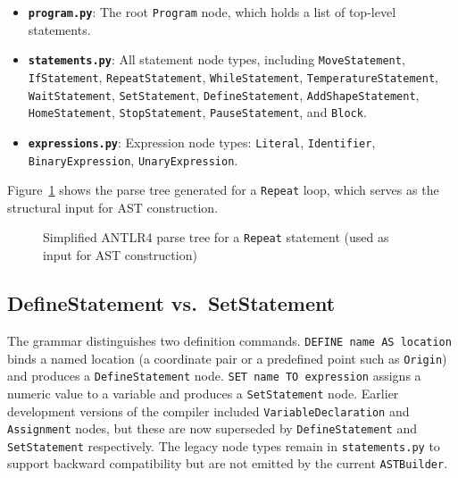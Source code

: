 \begin{itemize}
    \item[-] \textbf{\texttt{program.py}}: The root \texttt{Program} node, which holds a list of top-level statements.
    \item[-] \textbf{\texttt{statements.py}}: All statement node types, including \texttt{MoveStatement}, \texttt{IfStatement}, \texttt{RepeatStatement}, \texttt{WhileStatement}, \texttt{TemperatureStatement}, \texttt{WaitStatement}, \texttt{SetStatement}, \texttt{DefineStatement}, \texttt{AddShapeStatement}, \texttt{HomeStatement}, \texttt{StopStatement}, \texttt{PauseStatement}, and \texttt{Block}.
    \item[-] \textbf{\texttt{expressions.py}}: Expression node types: \texttt{Literal}, \texttt{Identifier}, \texttt{BinaryExpression}, \texttt{UnaryExpression}.
\end{itemize}

Figure~\ref{fig:ast-example} shows the parse tree generated for a \texttt{Repeat} loop, which serves as the structural input for AST construction.

\begin{figure}[H]
\centering
{}
\caption{Simplified ANTLR4 parse tree for a \texttt{Repeat} statement (used as input for AST construction)}
\label{fig:ast-example}
\end{figure}

\subsection*{DefineStatement vs.\ SetStatement}

The grammar distinguishes two definition commands. \texttt{DEFINE name AS location} binds a named location (a coordinate pair or a predefined point such as \texttt{Origin}) and produces a \texttt{DefineStatement} node. \texttt{SET name TO expression} assigns a numeric value to a variable and produces a \texttt{SetStatement} node. Earlier development versions of the compiler included \texttt{VariableDeclaration} and \texttt{Assignment} nodes, but these are now superseded by \texttt{DefineStatement} and \texttt{SetStatement} respectively. The legacy node types remain in \texttt{statements.py} to support backward compatibility but are not emitted by the current \texttt{ASTBuilder}.

